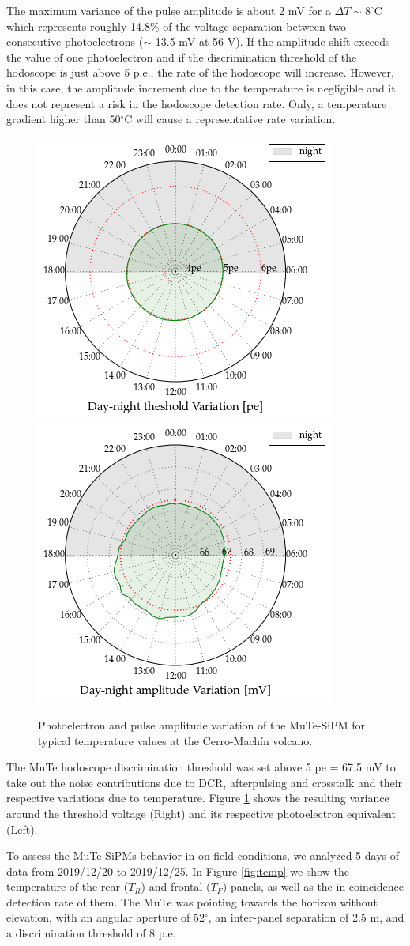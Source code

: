 \documentclass[a4paper,11pt]{article}
\begin{document}
The maximum variance of the pulse amplitude is about 2 mV for a $\Delta T \sim 8 ^{\circ}$C which represents roughly 14.8$\%$ of the voltage separation between two consecutive photoelectrons ($\sim$ 13.5 mV at 56 V). If the amplitude shift exceeds the value of one photoelectron and if the discrimination threshold of the hodoscope is just above 5 p.e., the rate of the hodoscope will increase. However, in this case, the amplitude increment due to the temperature is negligible and it does not represent a risk in the hodoscope detection rate. Only, a temperature gradient higher than 50$^{\circ}$C will cause a representative rate variation.

\begin{figure}[htbp]
\centering 
\includegraphics[width=.4\textwidth]{Figures/peT.png}
\includegraphics[width=.4\textwidth]{Figures/peakT.png}
\caption{\label{fig:thre} Photoelectron and pulse amplitude variation of the MuTe-SiPM for typical temperature values at the Cerro-Mach\'in volcano.}
\end{figure}

The MuTe hodoscope discrimination threshold was set above 5 pe = 67.5 mV to take out the noise contributions due to DCR, afterpulsing and crosstalk and their respective variations due to temperature. Figure \ref{fig:thre} shows the resulting variance around the threshold voltage (Right) and its respective photoelectron equivalent (Left). 

To assess the MuTe-SiPMs behavior in on-field conditions, we analyzed 5 days of data from 2019/12/20 to 2019/12/25. In Figure \ref{fig:temp} we show the temperature of the rear ($T_R$) and frontal ($T_F$) panels, as well as the in-coincidence detection rate of them. The MuTe was pointing towards the horizon without elevation, with an angular aperture of 52$^{\circ}$, an inter-panel separation of 2.5 m, and a discrimination threshold of 8 p.e.
\end{document}
